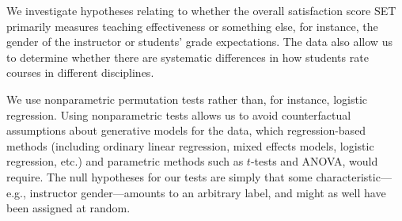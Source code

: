 \documentclass[12pt]{article}
\begin{document}
%
%
%
%
 
We investigate 
hypotheses relating to whether the overall satisfaction score SET primarily measures teaching
effectiveness or something else, for instance, the gender of the instructor or students'
grade expectations.
The data also allow us to determine whether there are systematic differences
in how students rate courses in different disciplines.

We use nonparametric permutation tests rather than, for instance, logistic regression.
Using nonparametric tests allows us to avoid counterfactual assumptions about
generative models for the data, which regression-based methods (including
ordinary linear regression, mixed effects models, logistic regression, etc.) and parametric
methods such as $t$-tests and ANOVA, would require.
The null hypotheses for our tests are simply that some 
characteristic---e.g., instructor gender---amounts to an arbitrary label, and might as well
have been assigned at random. 
\end{document}
